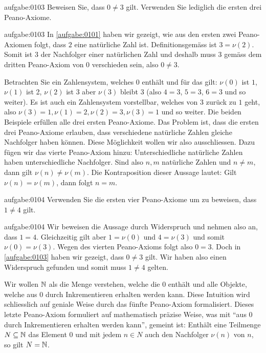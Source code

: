 \begin{aufgabe}{aufgabe:0103}
{Beweisen Sie, dass $0\neq 3$ gilt. Verwenden Sie lediglich die ersten drei Peano-Axiome.}
\end{aufgabe}
\begin{antwort}{aufgabe:0103}
In \cref{aufgabe:0101} haben wir gezeigt, wie aus den ersten zwei Peano-Axiomen folgt, dass $2$ eine natürliche Zahl ist. Definitionsgemäss ist $3=\nu(2)$. Somit ist $3$ der Nachfolger einer natürlichen Zahl und deshalb muss $3$ gemäss dem dritten Peano-Axiom von $0$ verschieden sein, also $0\neq 3$.
\end{antwort}
Betrachten Sie ein Zahlensystem, welches $0$ enthält und für das gilt: $\nu(0)$ ist $1$, $\nu(1)$ ist 2, $\nu(2)$ ist $3$ aber $\nu(3)$ bleibt $3$ (also $4=3$, $5=3$, $6=3$ und so weiter). Es ist auch ein Zahlensystem vorstellbar, welches von $3$ zurück zu $1$ geht, also $\nu(3)=1, \nu(1)=2, \nu(2)=3, \nu(3)=1$ und so weiter. Die beiden Beispiele erfüllen alle drei ersten Peano-Axiome. Das Problem ist, dass die ersten drei Peano-Axiome erlauben, dass verschiedene natürliche Zahlen gleiche Nachfolger haben können. Diese Möglichkeit wollen wir also ausschliessen. Dazu fügen wir das vierte Peano-Axiom hinzu:
{Unterschiedliche natürliche Zahlen haben unterschiedliche Nachfolger. Sind also $n,m$ natürliche Zahlen und $n\neq m$, dann gilt $\nu(n)\neq\nu(m)$. Die Kontraposition dieser Aussage lautet: Gilt $\nu(n)=\nu(m)$, dann folgt $n=m$.}
\begin{aufgabe}{aufgabe:0104}
{Verwenden Sie die ersten vier Peano-Axiome um zu beweisen, dass $1\neq 4$ gilt.}
\end{aufgabe}
\begin{antwort}{aufgabe:0104}
Wir beweisen die Aussage durch Widerspruch und nehmen also an, dass $1=4$. Gleichzeitig gilt aber $1=\nu(0)$ und $4=\nu(3)$ und somit $\nu(0)=\nu(3)$. Wegen des vierten Peano-Axioms folgt also $0=3$. Doch in \cref{aufgabe:0103} haben wir gezeigt, dass $0\neq 3$ gilt. Wir haben also einen Widerspruch gefunden und somit muss $1\neq 4$ gelten.
\end{antwort}
Wir wollen $\mathbb{N}$ als die Menge verstehen, welche die $0$ enthält und alle Objekte, welche aus $0$ durch Inkrementieren erhalten werden kann. Diese Intuition wird schliesslich auf geniale Weise durch das fünfte Peano-Axiom formalisiert. Dieses letzte Peano-Axiom formuliert auf mathematisch präzise Weise, was mit \enquote{aus $0$ durch Inkrementieren erhalten werden kann}, gemeint ist:
{Enthält eine Teilmenge $N\subseteq\mathbb{N}$ das Element $0$ und mit jedem $n\in N$ auch den Nachfolger $\nu(n)$ von $n$, so gilt $N=\mathbb{N}$.}

